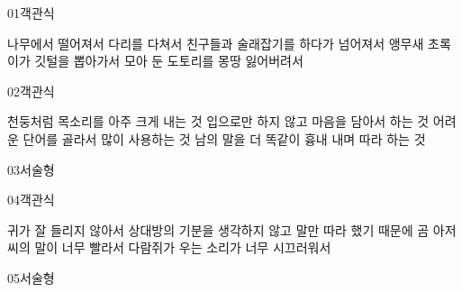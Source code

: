 \documentclass[fs12,seriesSau]{korfarm-base}
\begin{document}

\begin{kfQBlock}{01}{객관식}
\begin{kfChoices}
\kfChoice 나무에서 떨어져서 다리를 다쳐서
\kfChoice 친구들과 술래잡기를 하다가 넘어져서
\kfChoice 앵무새 초록이가 깃털을 뽑아가서
\kfChoice 모아 둔 도토리를 몽땅 잃어버려서
\end{kfChoices}
\end{kfQBlock}
\begin{kfQBlock}{02}{객관식}
\begin{kfChoices}
\kfChoice 천둥처럼 목소리를 아주 크게 내는 것
\kfChoice 입으로만 하지 않고 마음을 담아서 하는 것
\kfChoice 어려운 단어를 골라서 많이 사용하는 것
\kfChoice 남의 말을 더 똑같이 흉내 내며 따라 하는 것
\end{kfChoices}
\end{kfQBlock}
\begin{kfQBlock}{03}{서술형}
\end{kfQBlock}
\begin{kfQBlock}{04}{객관식}
\begin{kfChoices}
\kfChoice 귀가 잘 들리지 않아서
\kfChoice 상대방의 기분을 생각하지 않고 말만 따라 했기 때문에
\kfChoice 곰 아저씨의 말이 너무 빨라서
\kfChoice 다람쥐가 우는 소리가 너무 시끄러워서
\end{kfChoices}
\end{kfQBlock}
\begin{kfQBlock}{05}{서술형}
\end{kfQBlock}


\end{document}
